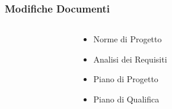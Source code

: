\begin{frame}
	\frametitle{Modifiche Documenti}
	
	
	\begin{columns}
		\begin{column}{0.2\textwidth}
			
		\end{column}
		
		\begin{column}{0.4\textwidth}
			\begin{itemize}
				\item Norme di Progetto
				\item Analisi dei Requisiti
				\item Piano di Progetto
				\item Piano di Qualifica
				
			\end{itemize}
		\end{column}
		
		\begin{column}{0.2\textwidth}
			
		\end{column}
	\end{columns}
	
\end{frame}